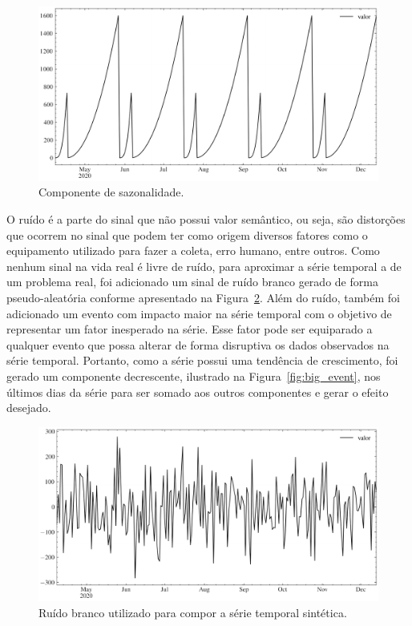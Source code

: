 \begin{figure}[!htp]
    \centering
    \includegraphics[width=5.0in]{img/seasonal_pattern.pdf}
    \caption{Componente de sazonalidade.}
    \label{fig:seasonal_pattern}
\end{figure}

O ruído é a parte do sinal que não possui valor semântico, ou seja, são distorções que ocorrem no sinal que podem ter como origem diversos fatores como o equipamento utilizado para fazer a coleta, erro humano, entre outros. Como nenhum sinal na vida real é livre de ruído, para aproximar a série temporal a de um problema real, foi adicionado um sinal de ruído branco gerado de forma pseudo-aleatória conforme apresentado na Figura~\ref{fig:noise}. Além do ruído, também foi adicionado um evento com impacto maior na série temporal com o objetivo de representar um fator inesperado na série. Esse fator pode ser equiparado a qualquer evento que possa alterar de forma disruptiva os dados observados na série temporal. Portanto, como a série possui uma tendência de crescimento, foi gerado um componente decrescente, ilustrado na Figura~\ref{fig:big_event}, nos últimos dias da série para ser somado aos outros componentes e gerar o efeito desejado.

\begin{figure}[!htp]
    \centering
    \includegraphics[width=5.0in]{img/noise.pdf}
    \caption{Ruído branco utilizado para compor a série temporal sintética.}
    \label{fig:noise}
\end{figure}


